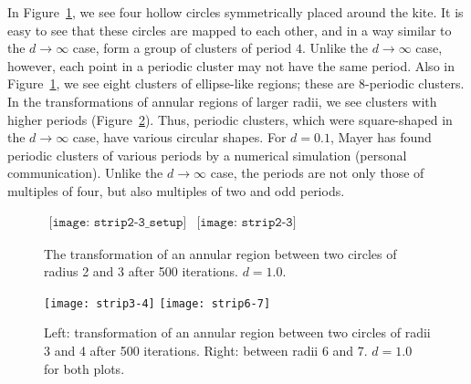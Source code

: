 \documentclass[12pt,twoside]{book}
\begin{document}
In Figure~\ref{fig:strip2-3}, we see four hollow circles symmetrically placed around the kite.
It is easy to see that these circles are mapped to each other, and in a way similar to the $d \to \infty$ case, form a group of clusters of period $4$.
Unlike the $d \to \infty$ case, however, each point in a periodic cluster may not have the same period.
Also in Figure~\ref{fig:strip2-3}, we see eight clusters of ellipse-like regions; these are 8-periodic clusters.
In the transformations of annular regions of larger radii, we see clusters with higher periods (Figure~\ref{fig:strip3-4-6-7}).
Thus, periodic clusters, which were square-shaped in the $d \to \infty$ case, have various circular shapes.
For $d = 0.1$, Mayer has found periodic clusters of various periods by a numerical simulation (personal communication).
Unlike the $d \to \infty$ case, the periods are not only those of multiples of four, but also multiples of two and odd periods.

\begin{figure}[ht]
  \begin{center}
    $
    \begin{array}{l}
      \texttt{[image: strip2-3\_setup]}
    \end{array}
    $\scalebox{1.75}{$\Rar$}$
    \begin{array}{l}
      \texttt{[image: strip2-3]}
    \end{array}
    $
    \caption{
      The transformation of an annular region between two circles of radius 2 and 3 after 500 iterations.
      $d = 1.0$.
    }
    \label{fig:strip2-3}
  \end{center}
\end{figure}

\begin{figure}[ht]
  \begin{center}
    \texttt{[image: strip3-4]}
    \texttt{[image: strip6-7]}
    \caption{Left: transformation of an annular region between two circles of radii 3 and 4 after 500 iterations.
      Right: between radii 6 and 7.
      $d = 1.0$ for both plots.
    }
    \label{fig:strip3-4-6-7}
  \end{center}
\end{figure}
\end{document}
